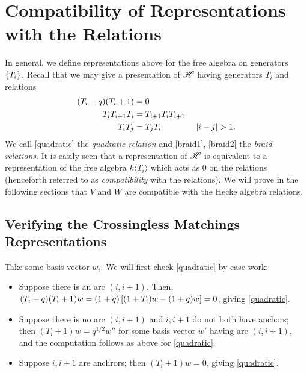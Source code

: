\documentclass{amsart}
\begin{document}
\newpage
\appendix
\section{Compatibility of Representations with the Relations}
In general, we define representations above for the free algebra on generators $\left\{ T_i \right\}$.
Recall that we may give a presentation of $\mathscr{H}$ having generators $T_i$ and relations
\begin{align}
  (T_i - q)(T_i + 1) &= 0 \label{quadratic}\\
  T_iT_{i+1}T_i &= T_{i+1}T_iT_{i+1} \label{braid1}\\ 
  T_iT_j &= T_jT_i \hspace{40pt} \left| i - j \right| > 1. \label{braid2}
\end{align}
We call \eqref{quadratic} the \emph{quadratic relation} and \eqref{braid1}, \eqref{braid2} the \emph{braid relations}.
It is easily seen that a representation of $\mathscr{H}$ is equivalent to a representation of the free algebra $k\langle T_i \rangle$ which acts as 0 on the relations (henceforth referred to as \emph{compatibility} with the relations).
We will prove in the following sections that $V$ and $W$ are compatible with the Hecke algebra relations.

\subsection{Verifying the Crossingless Matchings Representations}
\label{Cross Relations}
Take some basis vector $w_i$.
We will first check \eqref{quadratic} by case work:
\begin{itemize}
  \item Suppose there is an arc $(i,i+1)$.
    Then, $(T_i-q)(T_i + 1)w = (1 + q)\left[ (1 + T_i)w - (1 + q)w \right] = 0$, giving \eqref{quadratic}.

 
  \item Suppose there is no arc $(i,i+1)$ and $i,i+1$ do not both have anchors;
    then $(T_i +  1)w = q^{1/2}w''$ for some basis vector $w'$ having arc $(i,i+1)$, and the computation follows as above for \eqref{quadratic}.
  \item Suppose $i,i+1$ are anchrors;
    then $(T_i + 1)w = 0$, giving \eqref{quadratic}.
\end{itemize}
  
\end{document}
